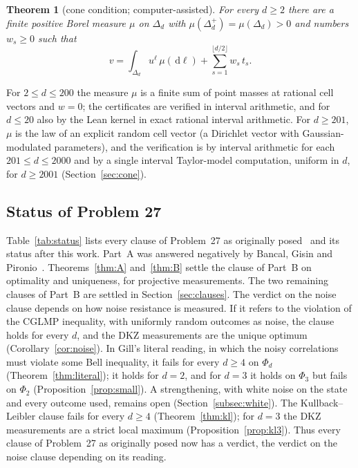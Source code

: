 \documentclass[11pt]{amsart}
\newtheorem{introthm}{Theorem}
\theoremstyle{definition}
\theoremstyle{remark}
\numberwithin{equation}{section}
\newcommand{\dd}{\,\mathrm{d}}
\begin{document}
\begin{introthm}[cone condition; computer-assisted]\label{thm:E}
For every $d\ge2$ there are a finite positive Borel measure $\mu$ on $\Delta_d$ with $\mu(\Delta_d^+)=\mu(\Delta_d)>0$
and numbers $w_s\ge0$ such that
\begin{equation}\label{eq:cone}
v=\int_{\Delta_d}u^\ell\,\mu(\dd\ell)+\sum_{s=1}^{\lfloor d/2\rfloor}w_s\,t_s .
\end{equation}
\end{introthm}

For $2\le d\le200$ the measure $\mu$ is a finite sum of point masses at rational cell vectors and $w=0$; the
certificates are verified in interval arithmetic, and for $d\le20$ also by the Lean kernel in exact rational interval
arithmetic. For $d\ge201$, $\mu$ is the law of an explicit random cell vector
(a Dirichlet vector with Gaussian-modulated parameters), and the verification is by interval arithmetic for each
$201\le d\le2000$ and by a single interval Taylor-model computation, uniform in $d$, for $d\ge2001$
(Section~\ref{sec:cone}).

\subsection{Status of Problem 27}
Table~\ref{tab:status} lists every clause of Problem~27 as originally posed~\cite{OQP} and its status after this work.
Part~A was answered negatively by Bancal, Gisin and Pironio~\cite{BGP}. Theorems~\ref{thm:A} and~\ref{thm:B} settle
the clause of Part~B on optimality and uniqueness, for projective measurements. The two remaining clauses of Part~B
are settled in Section~\ref{sec:clauses}. The verdict on the noise clause depends on how noise resistance is measured.
If it refers to the violation of the CGLMP inequality, with uniformly random outcomes as noise, the clause holds for
every $d$, and the DKZ measurements are the unique optimum (Corollary~\ref{cor:noise}). In Gill's literal reading, in
which the noisy correlations must violate some Bell inequality, it fails for every $d\ge4$ on $\Phi_d$
(Theorem~\ref{thm:literal}); it holds for $d=2$, and for $d=3$ it holds on $\Phi_3$ but fails on $\Phi_2$
(Proposition~\ref{prop:small}). A strengthening, with white noise on the state and every outcome used, remains open
(Section~\ref{subsec:white}). The Kullback--Leibler clause fails for every $d\ge4$ (Theorem~\ref{thm:kl}); for $d=3$
the DKZ measurements are a strict local maximum (Proposition~\ref{prop:kl3}). Thus every clause of Problem~27 as
originally posed now has a verdict, the verdict on the noise clause depending on its reading.
\end{document}
